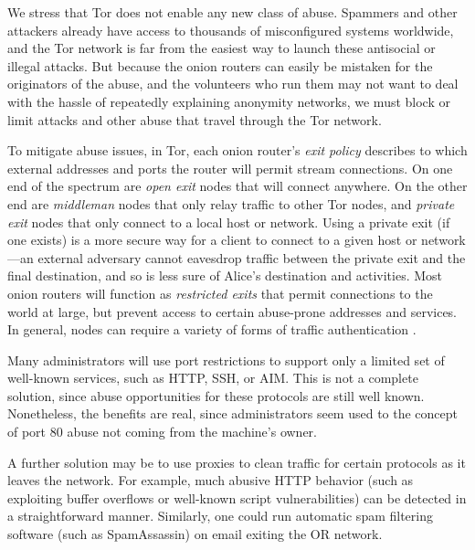\documentclass[times,10pt,twocolumn]{article}
\begin{document}
We stress that Tor does not enable any new class of abuse. Spammers
and other attackers already have access to thousands of misconfigured
systems worldwide, and the Tor network is far from the easiest way
to launch these antisocial or illegal attacks.
But because the
onion routers can easily be mistaken for the originators of the abuse,
and the volunteers who run them may not want to deal with the hassle of
repeatedly explaining anonymity networks, we must block or limit attacks
and other abuse that travel through the Tor network.

To mitigate abuse issues, in Tor, each onion router's \emph{exit policy}
describes to which external addresses and ports the router will permit
stream connections. On one end of the spectrum are \emph{open exit}
nodes that will connect anywhere. On the other end are \emph{middleman}
nodes that only relay traffic to other Tor nodes, and \emph{private exit}
nodes that only connect to a local host or network.  Using a private
exit (if one exists) is a more secure way for a client to connect to a
given host or network---an external adversary cannot eavesdrop traffic
between the private exit and the final destination, and so is less sure of
Alice's destination and activities. Most onion routers will function as
\emph{restricted exits} that permit connections to the world at large,
but prevent access to certain abuse-prone addresses and services. In
general, nodes can require a variety of forms of traffic authentication
\cite{or-discex00}.


Many administrators will use port restrictions to support only a
limited set of well-known services, such as HTTP, SSH, or AIM.
This is not a complete solution, since abuse opportunities for these
protocols are still well known. Nonetheless, the benefits are real,
since administrators seem used to the concept of port 80 abuse not
coming from the machine's owner.

A further solution may be to use proxies to clean traffic for certain
protocols as it leaves the network.  For example, much abusive HTTP
behavior (such as exploiting buffer overflows or well-known script
vulnerabilities) can be detected in a straightforward manner.
Similarly, one could run automatic spam filtering software (such as
SpamAssassin) on email exiting the OR network.
\end{document}

